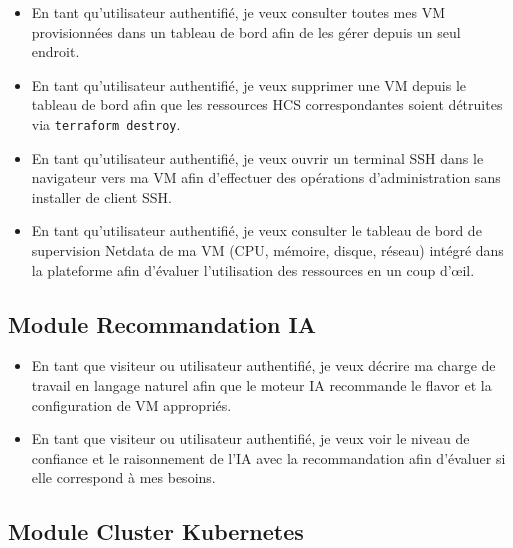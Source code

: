 \begin{itemize}
  \item En tant qu'utilisateur authentifié, je veux consulter toutes mes VM
        provisionnées dans un tableau de bord afin de les gérer depuis un seul endroit.
  \item En tant qu'utilisateur authentifié, je veux supprimer une VM depuis le tableau
        de bord afin que les ressources HCS correspondantes soient détruites via
        \texttt{terraform destroy}.
  \item En tant qu'utilisateur authentifié, je veux ouvrir un terminal SSH dans le
        navigateur vers ma VM afin d'effectuer des opérations d'administration sans
        installer de client SSH.
  \item En tant qu'utilisateur authentifié, je veux consulter le tableau de bord de
        supervision Netdata de ma VM (CPU, mémoire, disque, réseau) intégré dans la
        plateforme afin d'évaluer l'utilisation des ressources en un coup d'œil.
\end{itemize}

\subsection{Module Recommandation IA}

\begin{itemize}
  \item En tant que visiteur ou utilisateur authentifié, je veux décrire ma charge de
        travail en langage naturel afin que le moteur IA recommande le flavor et la
        configuration de VM appropriés.
  \item En tant que visiteur ou utilisateur authentifié, je veux voir le niveau de
        confiance et le raisonnement de l'IA avec la recommandation afin d'évaluer
        si elle correspond à mes besoins.
\end{itemize}

\subsection{Module Cluster Kubernetes}

